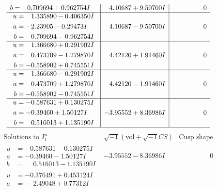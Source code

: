 \documentclass[1p]{elsarticle_modified}
\theoremstyle{definition}
\newcommand{\I}{\sqrt{-1}}
\begin{document}
$$\begin{array}{c|c|c}
\begin{aligned}
b &= \phantom{-}0.709694 + 0.962754 I\end{aligned}
 & \phantom{-}4.10687 + 9.50700 I & \phantom{-0.000000 } 0 \\ \hline\begin{aligned}
u &= \phantom{-}1.335890 - 0.406350 I \\
a &= -2.23905 - 0.29473 I \\
b &= \phantom{-}0.709694 - 0.962754 I\end{aligned}
 & \phantom{-}4.10687 - 9.50700 I & \phantom{-0.000000 } 0 \\ \hline\begin{aligned}
u &= \phantom{-}1.366680 + 0.291902 I \\
a &= \phantom{-}0.473709 - 1.279870 I \\
b &= -0.558902 + 0.745551 I\end{aligned}
 & \phantom{-}4.42120 + 1.91460 I & \phantom{-0.000000 } 0 \\ \hline\begin{aligned}
u &= \phantom{-}1.366680 - 0.291902 I \\
a &= \phantom{-}0.473709 + 1.279870 I \\
b &= -0.558902 - 0.745551 I\end{aligned}
 & \phantom{-}4.42120 - 1.91460 I & \phantom{-0.000000 } 0 \\ \hline\begin{aligned}
u &= -0.587631 + 0.130275 I \\
a &= -0.39460 + 1.50127 I \\
b &= \phantom{-}0.516013 + 1.135190 I\end{aligned}
 & -3.95552 + 8.36986 I & \phantom{-0.000000 } 0\\
 \hline 
 \end{array}$$\newpage$$\begin{array}{c|c|c}  
\text{Solutions to }I^u_{1}& \I (\text{vol} + \sqrt{-1}CS) & \text{Cusp shape}\\
 \hline 
\begin{aligned}
u &= -0.587631 - 0.130275 I \\
a &= -0.39460 - 1.50127 I \\
b &= \phantom{-}0.516013 - 1.135190 I\end{aligned}
 & -3.95552 - 8.36986 I & \phantom{-0.000000 } 0 \\ \hline\begin{aligned}
u &= -0.376491 + 0.453124 I \\
a &= \phantom{-}2.49048 + 0.77312 I \\

\end{aligned}
\end{array}$$
\end{document}
